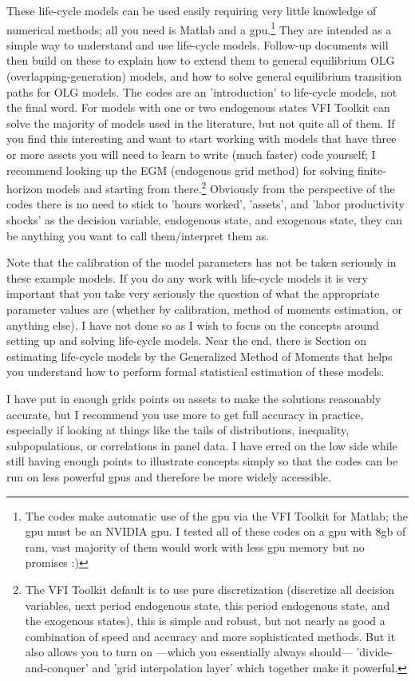 \documentclass[11pt]{article}%
\begin{document}
These life-cycle models can be used easily requiring very little knowledge of numerical methods; all you need is Matlab and a gpu.\footnote{The codes make automatic use of the gpu via the VFI Toolkit for Matlab; the gpu must be an NVIDIA gpu. I tested all of these codes on a gpu with 8gb of ram, vast majority of them would work with less gpu memory but no promises :)} They are intended as a simple way to understand and use life-cycle models. Follow-up documents will then build on these to explain how to extend them to general equilibrium OLG (overlapping-generation) models, and how to solve general equilibrium transition paths for OLG models. The codes are an 'introduction' to life-cycle models, not the final word. For models with one or two endogenous states VFI Toolkit can solve the majority of models used in the literature, but not quite all of them. If you find this interesting and want to start working with models that have three or more assets you will need to learn to write (much faster) code yourself; I recommend looking up the EGM (endogenous grid method) for solving finite-horizon models and starting from there.\footnote{The VFI Toolkit default is to use pure discretization (discretize all decision variables, next period endogenous state, this period endogenous state, and the exogenous states), this is simple and robust, but not nearly as good a combination of speed and accuracy and more sophisticated methods. But it also allows you to turn on ---which you essentially always should--- 'divide-and-conquer' and 'grid interpolation layer' which together make it powerful.} Obviously from the perspective of the codes there is no need to stick to 'hours worked', 'assets', and 'labor productivity shocks' as the decision variable, endogenous state, and exogenous state, they can be anything you want to call them/interpret them as.

Note that the calibration of the model parameters has not be taken seriously in these example models. If you do any work with life-cycle models it is very important that you take very seriously the question of what the appropriate parameter values are (whether by calibration, method of moments estimation, or anything else). I have not done so as I wish to focus on the concepts around setting up and solving life-cycle models. Near the end, there is Section on estimating life-cycle models by the Generalized Method of Moments that helps you understand how to perform formal statistical estimation of these models.

I have put in enough grids points on assets to make the solutions reasonably accurate, but I recommend you use more to get full accuracy in practice, especially if looking at things like the tails of distributions, inequality, subpopulations, or correlations in panel data. I have erred on the low side while still having enough points to illustrate concepts simply so that the codes can be run on less powerful gpus and therefore be more widely accessible.
\end{document}
